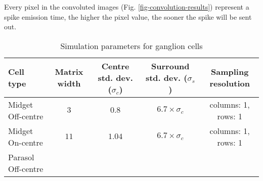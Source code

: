 Every pixel in the convoluted images (Fig. \ref{fig-convolution-results}) 
represent a spike emission time, the higher the pixel value, the sooner the 
spike will be sent out.
\begin{table}[htb]
  \caption{Simulation parameters for ganglion cells}
  \centering
  \begin{tabular}{l c c c c}
    \begin{minipage}{1.2cm}Cell type \end{minipage}& 
    \begin{minipage}{1cm} \centering Matrix width \end{minipage}&  
    \begin{minipage}{1.3cm}\centering Centre std. dev. ($\sigma_c$)\end{minipage} & 
    \begin{minipage}{1.3cm}\centering Surround std. dev. ($\sigma_s$)\end{minipage} & 
    \begin{minipage}{1.2cm}\centering Sampling resolution\end{minipage} \\
    \hline
    \begin{minipage}{1.2cm}\vspace*{0.1cm} Midget Off-centre \vspace*{0.005cm} \end{minipage}& 
    \begin{minipage}{1cm}\centering$3$ \end{minipage}& 
    $0.8$ & $6.7 \times \sigma_c$ &  
    \begin{minipage}{1.4cm}columns: 1, rows: 1\end{minipage}\\
    \begin{minipage}{1.2cm} Midget On-centre \vspace*{0.005cm}\end{minipage} & 
    \begin{minipage}{1cm}\centering $11$ \end{minipage}& 
    $1.04$ & $6.7 \times \sigma_c$ &  
    \begin{minipage}{1.4cm}columns: 1, rows: 1\end{minipage}\\
    \begin{minipage}{1.2cm}Parasol Off-centre \vspace*{0.005cm}\end{minipage} & 

\end{tabular}
\end{table}
